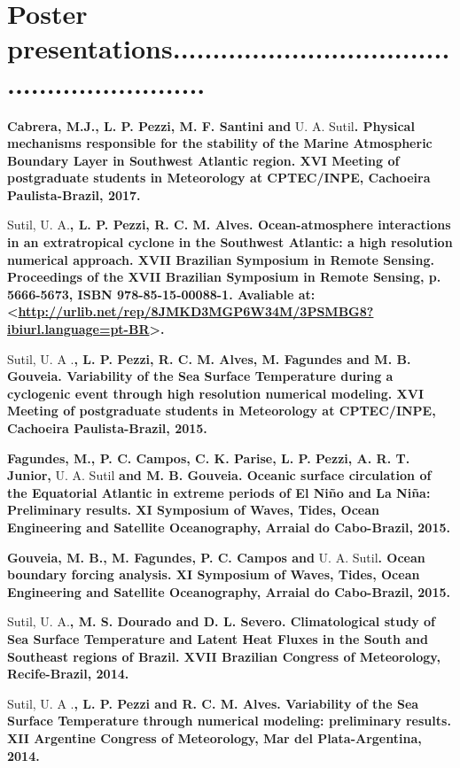 \documentclass[letterpaper]{twentysecondcv} %
\begin{document}
\section{Poster presentations\textcolor{mainblue}{............................................................}}


\textbf{Cabrera, M.J., L. P. Pezzi, M. F. Santini and} U. A. Sutil\textbf{. Physical mechanisms responsible for the stability of the Marine Atmospheric Boundary Layer in Southwest Atlantic region. XVI Meeting of postgraduate students in Meteorology at CPTEC/INPE, Cachoeira Paulista-Brazil, 2017.}\

\newpage
\makeprofile

Sutil, U. A.\textbf{, L. P. Pezzi, R. C. M. Alves. Ocean-atmosphere interactions in an extratropical cyclone in the Southwest Atlantic: a high resolution numerical approach. XVII Brazilian Symposium in Remote Sensing. Proceedings of the XVII Brazilian Symposium in Remote Sensing, p. 5666-5673, ISBN 978-85-15-00088-1. Avaliable at:<\textcolor{mainblue}{\href{http://urlib.net/rep/8JMKD3MGP6W34M/3PSMBG8?ibiurl.language=pt-BR}{http://urlib.net/rep/8JMKD3MGP6W34M/3PSMBG8?ibiurl.language=pt-BR}}>.}

Sutil, U. A .\textbf{, L. P. Pezzi, R. C. M. Alves, M. Fagundes and M. B. Gouveia. Variability of the Sea Surface Temperature during a cyclogenic event through high resolution numerical modeling. XVI Meeting of postgraduate students in Meteorology at CPTEC/INPE, Cachoeira Paulista-Brazil, 2015.}

\textbf{Fagundes, M., P. C. Campos, C. K. Parise, L. P. Pezzi, A. R. T. Junior,} U. A. Sutil\textbf{ and M. B. Gouveia. Oceanic surface circulation of the Equatorial Atlantic in extreme periods of El Niño and La Niña: Preliminary results. XI Symposium of Waves, Tides, Ocean Engineering and Satellite Oceanography, Arraial do Cabo-Brazil, 2015.}

\textbf{Gouveia, M. B., M. Fagundes, P. C. Campos and} U. A. Sutil\textbf{. Ocean boundary forcing analysis. XI Symposium of Waves, Tides, Ocean Engineering and Satellite Oceanography, Arraial do Cabo-Brazil, 2015.}

Sutil, U. A.\textbf{, M. S. Dourado and D. L. Severo. Climatological study of Sea Surface Temperature and Latent Heat Fluxes in the South and Southeast regions of Brazil. XVII Brazilian Congress of Meteorology, Recife-Brazil, 2014.}

Sutil, U. A .\textbf{, L. P. Pezzi and R. C. M. Alves. Variability of the Sea Surface Temperature through numerical modeling: preliminary results. XII Argentine Congress of Meteorology, Mar del Plata-Argentina, 2014.}
\end{document}
